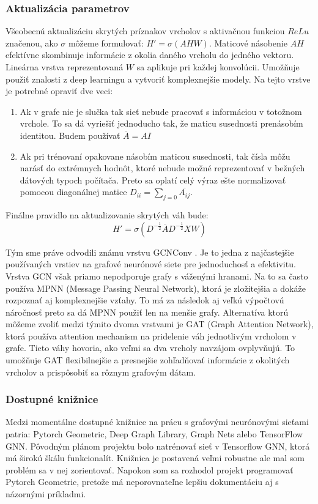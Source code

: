 \documentclass{article}
\begin{document}
\subsubsection*{Aktualizácia parametrov}
Všeobecnú aktualizáciu skrytých príznakov vrcholov s aktivačnou funkciou $ReLu$ značenou, ako $\sigma$ môžeme formulovať: $H' = \sigma(AHW)$. Maticové násobenie $AH$ efektívne skombinuje informácie z okolia daného vrcholu do jedného vektoru. Lineárna vrstva reprezentovaná $W$ sa aplikuje pri každej konvolúcii. Umožňuje použiť znalosti z deep learningu a vytvoriť komplexnejšie modely. Na tejto vrstve je potrebné opraviť dve veci:
\begin{enumerate}
    \item Ak v grafe nie je slučka tak sieť nebude pracovať s informáciou v totožnom vrchole. To sa dá vyriešiť jednoducho tak, že maticu susednosti prenásobím identitou. Budem používať $\overline{A} = A I$
    \item Ak pri trénovaní opakovane násobím maticou susednosti, tak čísla môžu narásť do extrémnych hodnôt, ktoré nebude možné reprezentovať v bežných dátových typoch počítača. Preto sa oplatí celý výraz ešte normalizovať pomocou diagonálnej matice $D_{ii} = \sum_{j=0} \overline{A_{ij}}$.
\end{enumerate}

Finálne pravidlo na aktualizovanie skrytých váh bude:
$$H' = \sigma(D^{-\frac{1}{2}} \overline{A} D^{-\frac{1}{2}} XW) $$

Tým sme práve odvodili známu vrstvu GCNConv \cite{GCN}. Je to jedna z najčastejšie používaných vrstiev na grafové neurónové siete pre jednoduchosť a efektivitu. Vrstva GCN však priamo nepodporuje grafy s váženými hranami. Na to sa často používa MPNN (Message Passing Neural Network), ktorá je zložitejšia a dokáže rozpoznať aj komplexnejšie vzťahy. To má za následok aj veľkú výpočtovú náročnosť preto sa dá MPNN použiť len na menšie grafy. Alternatíva ktorú môžeme zvoliť medzi týmito dvoma vrstvami je GAT (Graph Attention Network), ktorá používa attention mechanism na pridelenie váh jednotlivým vrcholom v grafe. Tieto váhy hovoria, ako veľmi sa dva vrcholy navzájom ovplyvňujú. To umožňuje GAT flexibilnejšie a presnejšie zohľadňovať informácie z okolitých vrcholov a prispôsobiť sa rôznym grafovým dátam. \cite{GAT}


\subsubsection*{Dostupné knižnice}
Medzi momentálne dostupné knižnice na prácu s grafovými neurónovými sieťami patria: Pytorch Geometric, Deep Graph Library, Graph Nets alebo TensorFlow GNN. Pôvodným plánom projektu bolo natrénovať sieť v Tensorflow GNN, ktorá má širokú škálu funkcionalít. Knižnica je postavená veľmi robustne ale mal som problém sa v nej zorientovať. Napokon som sa rozhodol projekt programovať Pytorch Geometric, pretože má neporovnateľne lepšiu dokumentáciu aj s názornými príkladmi.
\end{document}
